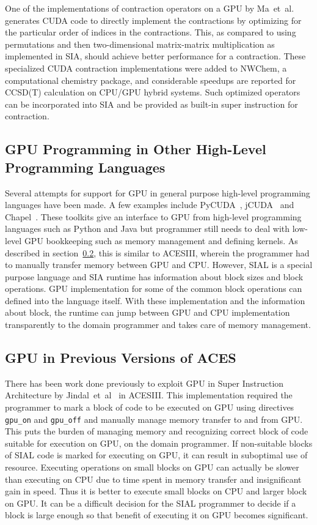 One of the implementations of contraction operators on a GPU by
Ma~et~al.~\cite{Ma2013} generates CUDA code to directly implement the contractions
by optimizing for the particular order of indices in the contractions. This, as
compared to using permutations and then two-dimensional matrix-matrix multiplication
as implemented in SIA, should achieve better performance for a contraction. These
specialized CUDA contraction implementations were added to NWChem, a computational
chemistry package, and considerable speedups are reported for CCSD(T) calculation
on CPU/GPU hybrid systems. Such optimized operators can be incorporated into SIA
and be provided as built-in super instruction for contraction.

\subsection{GPU Programming in Other High-Level Programming Languages}
Several attempts for support for GPU in general purpose high-level programming
languages have been made. A few examples include PyCUDA~\cite{pycuda2011},
jCUDA~\cite{jcuda2009} and Chapel~\cite{chapelgpu}. These toolkits give an interface
to GPU from high-level programming languages such as Python and Java but
programmer still needs to deal with low-level GPU bookkeeping such as memory
management and defining kernels. As described in section~\ref{relatedworkacesiiigpu},
this is similar to ACESIII, wherein the programmer had to manually transfer memory
between GPU and CPU. However, SIAL is a special purpose language and SIA runtime
has information about block sizes and block operations. GPU implementation for
some of the common block operations can defined into the language itself. With
these implementation and the information about block, the runtime can jump between
GPU and CPU implementation transparently to the domain programmer and takes care
of memory management.

\subsection{GPU in Previous Versions of ACES}\label{relatedworkacesiiigpu}
There has been work done previously to exploit GPU in Super Instruction
Architecture by Jindal~et~al~\cite{Jindal2016} in ACESIII. This implementation
required the programmer to mark a block of code to be executed on GPU using
directives \texttt{gpu\_on} and \texttt{gpu\_off} and manually manage memory
transfer to and from GPU. This puts the burden of managing memory and recognizing
correct block of code suitable for execution on GPU, on the domain programmer.
If non-suitable blocks of SIAL code is marked for executing on GPU, it can result
in suboptimal use of resource. Executing operations on small blocks on GPU can
actually be slower than executing on CPU due to time spent in memory transfer and
insignificant gain in speed. Thus it is better to execute small blocks on CPU and
larger block on GPU. It can be a difficult decision for the SIAL programmer to decide
if a block is large enough so that benefit of executing it on GPU becomes significant.

